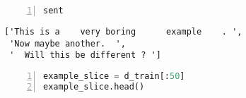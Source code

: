 \documentclass[10pt,parskip=half,
	toc=sectionentrywithdots,
	bibliography=totocnumbered,
	captions=tableheading,numbers=noendperiod]{scrartcl}
\begin{document}
\begin{lstlisting}[language=Python,numbers=left,xleftmargin=20pt,xrightmargin=5pt,belowskip=5pt,aboveskip=5pt]
sent
\end{lstlisting}

\begin{lstlisting}[language={},postbreak={},numbers=none,xrightmargin=7pt,breakindent=0pt,aboveskip=5pt,belowskip=5pt]
['This is a    very boring      example    . ',
 'Now maybe another.  ',
 '  Will this be different ? ']
\end{lstlisting}

\begin{lstlisting}[language=Python,numbers=left,xleftmargin=20pt,xrightmargin=5pt,belowskip=5pt,aboveskip=5pt]
example_slice = d_train[:50]
example_slice.head()
\end{lstlisting}
\end{document}
